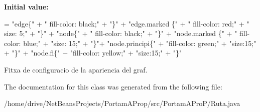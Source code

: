 {\bfseries Initial value\+:}
\begin{DoxyCode}
= 
         \textcolor{stringliteral}{"edge\{"} +
        \textcolor{stringliteral}{"   fill-color: black;"} +
        \textcolor{stringliteral}{"\}"} +
        \textcolor{stringliteral}{"edge.marked \{"} +
        \textcolor{stringliteral}{"   fill-color: red;"}
            + \textcolor{stringliteral}{" size: 5;"} +
        \textcolor{stringliteral}{"\}"} +  \textcolor{stringliteral}{"node\{"} +
        \textcolor{stringliteral}{"   fill-color: black;"} +
        \textcolor{stringliteral}{"\}"} +
        \textcolor{stringliteral}{"node.marked \{"} +
        \textcolor{stringliteral}{"   fill-color: blue;"}
            + \textcolor{stringliteral}{"size: 15;"} +
        \textcolor{stringliteral}{"\}"}+
            \textcolor{stringliteral}{"node.principi\{"}
            + \textcolor{stringliteral}{"fill-color: green;"}
            + \textcolor{stringliteral}{"size:15;"}
            + \textcolor{stringliteral}{"\}"}
            + \textcolor{stringliteral}{"node.fi\{"}
            + \textcolor{stringliteral}{"fill-color: yellow;"}
            + \textcolor{stringliteral}{"size:15;"}
            + \textcolor{stringliteral}{"\}"}
\end{DoxyCode}


Fitxa de configuracio de la apariencia del graf. 



The documentation for this class was generated from the following file\+:\begin{DoxyCompactItemize}
\item 
/home/drive/\+Net\+Beans\+Projects/\+Portam\+A\+Prop/src/\+Portam\+A\+Pro\+P/Ruta.\+java\end{DoxyCompactItemize}
